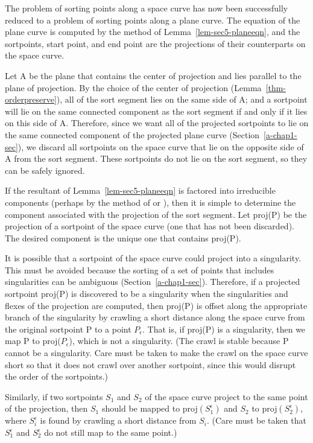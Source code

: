 The problem of sorting points along a space curve has now been successfully
reduced to a problem of sorting points along a plane curve.
The equation of the plane curve is computed by the method of 
Lemma~\ref{lem-sec5-planeeqn},
and the sortpoints, start point, and end point are the projections of their
counterparts on the space curve.

Let A be the plane that contains the center of projection and lies parallel
to the plane of projection.
By the choice of the center of projection (Lemma~\ref{thm-orderpreserve}),
all of the sort segment lies on
the same side of A; and a sortpoint will lie on the same connected 
component as the sort segment if and only if it lies on this side of A.
Therefore, 
since we want all of the projected sortpoints to lie on the same connected
component of the projected plane curve (Section~\ref{a-chap1-sec}),
we discard all sortpoints on the space curve
that lie on the opposite side of A from the sort segment.
These sortpoints do not lie on the sort segment, so they can be safely
ignored.

If the resultant of Lemma~\ref{lem-sec5-planeeqn}
is factored into irreducible components (perhaps by the method of \cite{berlekamp}
or \cite{wang}),
then it is simple
to determine the component associated with the projection of the sort segment.
Let proj(P) be the projection of a sortpoint of the space curve
(one that has not been discarded).
The desired component is the unique one that contains proj(P).

It is possible that a sortpoint of the space curve could 
project into a singularity.
This must be avoided because the sorting of a set of points that
includes singularities can be ambiguous (Section~\ref{a-chap1-sec}).
Therefore, if a projected sortpoint proj(P) is discovered to be a 
singularity when the singularities and flexes of the projection are
computed, then proj(P) is offset along the appropriate branch 
of the singularity
by crawling a short distance along the space curve from the original 
sortpoint P to a point $P_{\epsilon}$.
That is, if proj(P) is a singularity, then we map P to 
proj($P_{\epsilon}$), which is not a singularity.
(The crawl is stable because P cannot be a singularity.
Care must be taken to make the crawl on the space curve short so that
it does not crawl over another sortpoint, since this would disrupt the order
of the sortpoints.)

Similarly, if two sortpoints $S_{1}$ and $S_{2}$ of the space curve
project to the same point of the projection, then $S_{1}$ should be mapped
to \mbox{proj$(S_{1}^{\epsilon})$} and $S_{2}$ to 
\mbox{proj$(S_{2}^{\epsilon})$}, where $S_{i}^{\epsilon}$ is found by
crawling a short distance from $S_{i}$.
(Care must be taken that $S_{1}^{\epsilon}$ and $S_{2}^{\epsilon}$
do not still map to the same point.)

